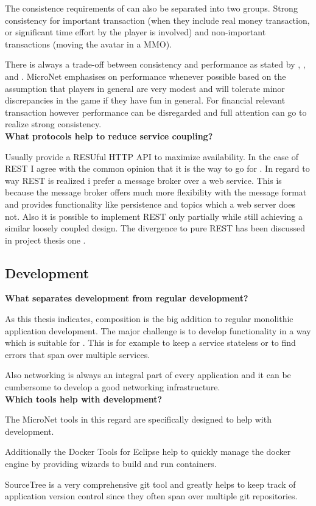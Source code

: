 The consistence requirements of \ogs{} can also be separated into two groups.
Strong consistency for important transaction (when they include real money
transaction, or significant time effort by the player is involved) and
non-important transactions (moving the avatar in a MMO).

There is always a trade-off between consistency and performance as stated by
\cite{wada2011data}, \cite{olston2000offering}, and
\cite{franklin1997transactional}. MicroNet emphasises on performance whenever
possible based on the assumption that players in general are very modest and
will tolerate minor discrepancies in the game if they have fun in general. For
financial relevant transaction however performance can be disregarded and full
attention can go to realize strong consistency.\\

\noindent
\textbf{What protocols help to reduce service coupling?}

Usually \ms{} provide a RESUful HTTP API to maximize availability. In the case
of REST I agree with the common opinion that it is the way to go for \mss{}. In
regard to way REST is realized i prefer a message broker over a web service.
This is because the message broker offers much more flexibility with the message
format and provides functionality like persistence and topics which a web server
does not. Also it is possible to implement REST only partially while still
achieving a similar loosely coupled design. The divergence to pure REST
has been discussed in project thesis one .\\

\subsection{\ms{} Development}

\noindent
\textbf{What separates \ms{} development from regular development?}

As this thesis indicates, \ms{} composition is the big addition to regular
monolithic application development. The major challenge is to develop
functionality in a way which is suitable for \ms{}. This is for example to keep
a service stateless or to find errors that span over multiple services. 

Also networking is always an integral part of every \ms{} application and it
can be cumbersome to develop a good networking infrastructure.\\

\noindent
\textbf{Which tools help with \ms{} development?}

The MicroNet tools in this regard are specifically designed to help with \ms{}
development. 

Additionally the Docker Tools for Eclipse help to quickly manage
the docker engine by providing wizards to build and run containers. 

SourceTree is a very comprehensive git tool and greatly helps to keep track of
\ms{} application version control since they often span over multiple git
repositories.

